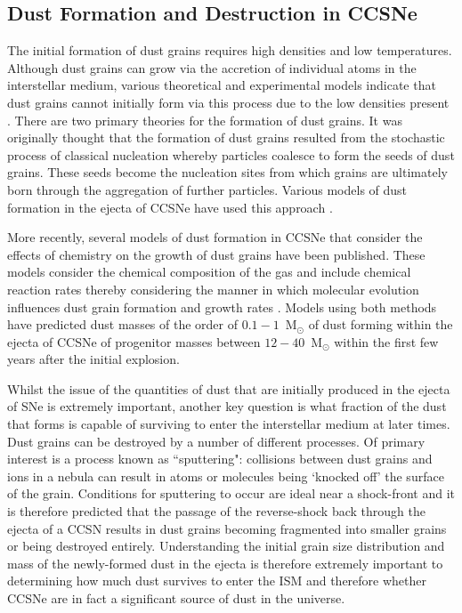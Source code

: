 \subsection{Dust Formation and Destruction in CCSNe}
\label{scn:dust_formation}

The initial formation of dust grains requires high densities and low temperatures.  Although dust grains can grow via the accretion of individual atoms in the interstellar medium, various theoretical and experimental models indicate that dust grains cannot initially form via this process due to the low densities present \citep{Osterbrock2006}.  There are two primary theories for the formation of dust grains.  It was originally thought that the formation of dust grains resulted from the stochastic process of classical nucleation whereby particles coalesce to form the seeds of dust grains.  These seeds become the nucleation sites from which grains are ultimately born through the aggregation of further particles.  Various models of dust formation in the ejecta of CCSNe have used this approach \citep{Kozasa1989, Todini2001,Nozawa2003, Schneider2004}.  

More recently, several models of dust formation in CCSNe that consider the effects of chemistry on the growth of dust grains have been published.   These models consider the chemical composition of the gas and include chemical reaction rates thereby considering the manner in which molecular evolution influences dust grain formation and growth rates \citep{Cherchneff2009, Cherchneff2010, Sarangi2013, Sarangi2015}.  Models using both methods have predicted dust masses of the order of $0.1-1$~M$_{\odot}$ of dust forming within the ejecta of CCSNe of progenitor masses between $12-40$~M$_{\odot}$ within the first few years after the initial explosion.  

Whilst the issue of the quantities of dust that are initially produced in the ejecta of SNe is extremely important, another key question is what fraction of the dust that forms is capable of surviving to enter the interstellar medium at later times. Dust grains can be destroyed by a number of different processes.  Of primary interest is a process known as ``sputtering": collisions between dust grains and ions in a nebula can result in atoms or molecules being `knocked off' the surface of the grain.  Conditions for sputtering to occur are ideal near a shock-front \citep{Barlow1977} and it is therefore predicted that the passage of the reverse-shock back through the ejecta of a CCSN results in dust grains becoming fragmented into smaller grains or being destroyed entirely.  Understanding the initial grain size distribution and mass of the newly-formed dust in the ejecta is therefore extremely important to determining how much dust survives to enter the ISM and therefore whether CCSNe are in fact a significant source of dust in the universe.

